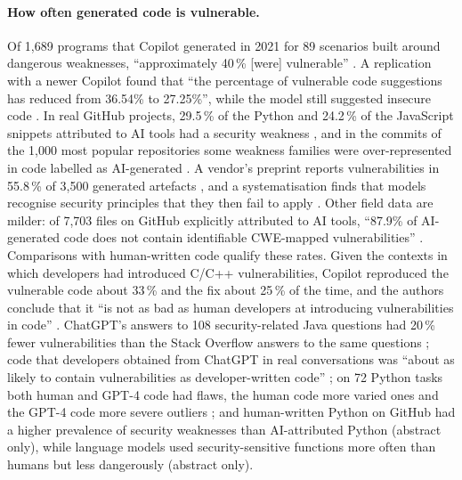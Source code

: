 \paragraph{How often generated code is vulnerable.}
Of 1,689 programs that Copilot generated in 2021 for 89 scenarios built
around dangerous weaknesses, \enquote{approximately 40\,\% [were]
vulnerable} \autocite[abstract]{Pearce2022Asleep}.
A replication with a newer Copilot found that \enquote{the percentage of
vulnerable code suggestions has reduced from 36.54\% to 27.25\%}, while the
model still suggested insecure code
\autocite[abstract]{Majdinasab2024Replication}.
In real GitHub projects, 29.5\,\% of the Python and 24.2\,\% of the
JavaScript snippets attributed to AI tools had a security weakness
\autocite[abstract]{Fu2025Weaknesses}, and in the commits of the 1,000 most
popular repositories some weakness families were over-represented in code
labelled as AI-generated \autocite{Wang2025Wild}.
A vendor's preprint reports vulnerabilities in 55.8\,\% of 3,500 generated
artefacts \autocite{Blain2026Broken}, and a systematisation finds that
models recognise security principles that they then fail to apply
\autocite{Patir2026SoK}.
Other field data are milder: of 7,703 files on GitHub explicitly attributed
to AI tools, \enquote{87.9\% of AI-generated code does not contain
identifiable CWE-mapped vulnerabilities} \autocite[abstract]{Schreiber2025GitHub}.
Comparisons with human-written code qualify these rates.
Given the contexts in which developers had introduced C/C++
vulnerabilities, Copilot reproduced the vulnerable code about 33\,\% and the
fix about 25\,\% of the time, and the authors conclude that it \enquote{is
not as bad as human developers at introducing vulnerabilities in code}
\autocite[abstract]{Asare2023Copilot}.
ChatGPT's answers to 108 security-related Java questions had 20\,\% fewer
vulnerabilities than the Stack Overflow answers to the same questions
\autocite[abstract]{Hamer2024Copy}; code that developers obtained from
ChatGPT in real conversations was \enquote{about as likely to contain
vulnerabilities as developer-written code}
\autocite[abstract]{Belozerov2026Repair}; on 72 Python tasks both human and
GPT-4 code had flaws, the human code more varied ones and the GPT-4 code
more severe outliers \autocite{Licorish2025Jury}; and human-written Python
on GitHub had a higher prevalence of security weaknesses than AI-attributed
Python \autocite{CaballeroIgnacio2026Trends} (abstract only), while
language models used security-sensitive functions more often than humans
but less dangerously \autocite{Lee2026HumanAI} (abstract only).

